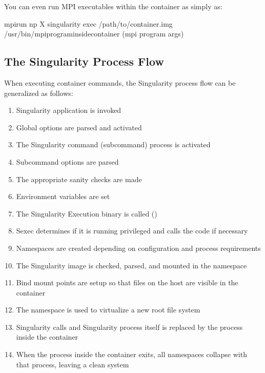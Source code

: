 \documentclass[letterpaper,10pt,english]{sphinxmanual}
\begin{document}
You can even run MPI executables within the container as simply as:

%
\begin{sphinxVerbatim}[commandchars=\\\{\}]
\PYGZdl{} mpirun \PYGZhy{}np X singularity exec /path/to/container.img /usr/bin/mpi\PYGZus{}program\PYGZus{}inside\PYGZus{}container (mpi program args)
\end{sphinxVerbatim}


\subsection{The Singularity Process Flow}
\label{\detokenize{introduction:the-singularity-process-flow}}
When executing container commands, the Singularity process flow can be
generalized as follows:
\begin{enumerate}
\item {} 
Singularity application is invoked

\item {} 
Global options are parsed and activated

\item {} 
The Singularity command (subcommand) process is activated

\item {} 
Subcommand options are parsed

\item {} 
The appropriate sanity checks are made

\item {} 
Environment variables are set

\item {} 
The Singularity Execution binary is called ()

\item {} 
Sexec determines if it is running privileged and calls the  code if
necessary

\item {} 
Namespaces are created depending on configuration and process
requirements

\item {} 
The Singularity image is checked, parsed, and mounted in the
namespace

\item {} 
Bind mount points are setup so that files on the host are visible in
the  container

\item {} 
The namespace  is used to virtualize a new root file system

\item {} 
Singularity calls  and Singularity process itself is replaced by the
process inside the container

\item {} 
When the process inside the container exits, all namespaces collapse
with that process, leaving a clean system

\end{enumerate}
\end{document}
